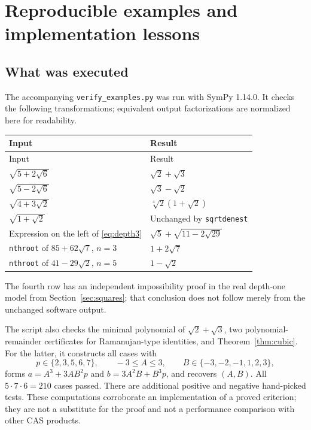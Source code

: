 \documentclass[11pt,a4paper]{article}
\numberwithin{equation}{section}
\theoremstyle{definition}\newtheorem{definition}[theorem]{Definition}
\theoremstyle{remark}\newtheorem{remark}[theorem]{Remark}
\begin{document}
\section{Reproducible examples and implementation lessons}
\label{sec:tests}

\subsection{What was executed}
The accompanying \texttt{verify\_examples.py} was run with SymPy 1.14.0. It checks the following transformations; equivalent output factorizations are normalized here for readability.
\begin{longtable}{@{}>{\raggedright\arraybackslash}p{}>{\raggedright\arraybackslash}p{}@{}}
\toprule Input & Result \\
\midrule\endfirsthead
\toprule Input & Result \\
\midrule\endhead
$\sqrt{5+2\sqrt6}$ & $\sqrt2+\sqrt3$\\[5pt]
$\sqrt{5-2\sqrt6}$ & $\sqrt3-\sqrt2$\\[5pt]
$\sqrt{4+3\sqrt2}$ & $\sqrt[4]2(1+\sqrt2)$\\[5pt]
$\sqrt{1+\sqrt2}$ & Unchanged by \texttt{sqrtdenest}\\[5pt]
Expression on the left of \eqref{eq:depth3} & $\sqrt5+\sqrt{11-2\sqrt{29}}$\\[5pt]
\texttt{nthroot} of $85+62\sqrt7$, $n=3$ & $1+2\sqrt7$\\[5pt]
\texttt{nthroot} of $41-29\sqrt2$, $n=5$ & $1-\sqrt2$\\
\bottomrule
\end{longtable}
The fourth row has an independent impossibility proof in the real depth-one model from Section~\ref{sec:squares}; that conclusion does not follow merely from the unchanged software output.

The script also checks the minimal polynomial of $\sqrt2+\sqrt3$, two polynomial-remainder certificates for Ramanujan-type identities, and Theorem~\ref{thm:cubic}. For the latter, it constructs all cases with
\[
p\in\{2,3,5,6,7\},\qquad -3\le A\le3,\qquad
B\in\{-3,-2,-1,1,2,3\},
\]
forms $a=A^3+3AB^2p$ and $b=3A^2B+B^3p$, and recovers $(A,B)$. All $5\cdot7\cdot6=210$ cases passed. There are additional positive and negative hand-picked tests. These computations corroborate an implementation of a proved criterion; they are not a substitute for the proof and not a performance comparison with other CAS products.
\end{document}

